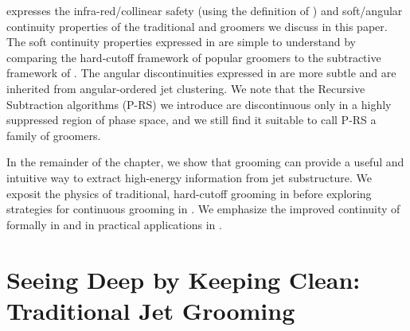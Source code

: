 \begin{table}[t]
    \centering
    

    \caption[Safety and continuity properties of the \PIRANHA{} and Soft Drop grooming algorithms.]{
    Safety and continuity properties of the \PIRANHA{} and Soft Drop grooming algorithms studied in this chapter.
    The mark \cmark~indicates that a groomer satisfies the associated condition, while the mark \xmark~indicates that it does not.
    The mark \raisebox{0.15 em}{\danger} indicates that a groomer does not satisfy the condition, but only in a boundary region of phase space that is exponentially suppressed at leading order in perturbative QCD.
    The mark \raisebox{0.15 em}{\danger} indicates that a groomer does not satisfy the condition, but only in a boundary region of phase space that is exponentially suppressed at leading order in perturbative QCD.\footnotemark
    }
    \label{tab:groomerlist}
\end{table}

 expresses the infra-red/collinear safety (using the definition of ) and soft/angular continuity properties of the traditional and \PIRANHA{} groomers we discuss in this paper.
%
The soft continuity properties expressed in  are simple to understand by comparing the hard-cutoff framework of popular groomers to the subtractive framework of \PIRANHA{}.
%
The angular discontinuities expressed in  are more subtle and are inherited from angular-ordered jet clustering.
%
We note that the Recursive Subtraction algorithms (P-RS) we introduce are discontinuous only in a highly suppressed region of phase space, and we still find it suitable to call P-RS a family of \PIRANHA{} groomers.


In the remainder of the chapter, we show that grooming can provide a useful and intuitive way to extract high-energy information from jet substructure.
%
We exposit the physics of traditional, hard-cutoff grooming in  before exploring \PIRANHA{} strategies for continuous grooming in .
%
We emphasize the improved continuity of \PIRANHA{} formally in  and in practical applications in .





\section{Seeing Deep by Keeping Clean: Traditional Jet Grooming}
\label{sec:traditional-grooming}

